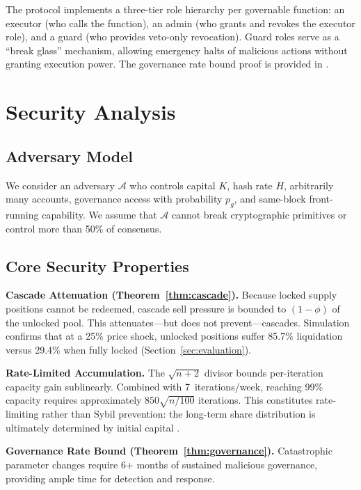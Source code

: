 \documentclass[10pt,a4paper,twocolumn]{article}
\theoremstyle{definition}
\theoremstyle{plain}
\theoremstyle{remark}
\begin{document}
The protocol implements a three-tier role hierarchy per governable function: an executor (who calls the function), an admin (who grants and revokes the executor role), and a guard (who provides veto-only revocation). Guard roles serve as a ``break glass'' mechanism, allowing emergency halts of malicious actions without granting execution power. The governance rate bound proof is provided in \cite[\S B]{apx}.

\section{Security Analysis}
\label{sec:security}

\subsection{Adversary Model}

We consider an adversary $\mathcal{A}$ who controls capital $K$, hash rate $H$, arbitrarily many accounts, governance access with probability $p_g$, and same-block front-running capability. We assume that $\mathcal{A}$ cannot break cryptographic primitives or control more than 50\% of consensus.

\subsection{Core Security Properties}

\textbf{Cascade Attenuation (Theorem~\ref{thm:cascade}).} Because locked supply positions cannot be redeemed, cascade sell pressure is bounded to $(1{-}\phi)$ of the unlocked pool. This attenuates---but does not prevent---cascades. Simulation confirms that at a 25\% price shock, unlocked positions suffer 85.7\% liquidation versus 29.4\% when fully locked (Section~\ref{sec:evaluation}).

\textbf{Rate-Limited Accumulation.} The $\sqrt{n{+}2}$ divisor bounds per-iteration capacity gain sublinearly. Combined with 7~iterations/week, reaching 99\% capacity requires approximately $850\sqrt{n/100}$ iterations. This constitutes rate-limiting rather than Sybil prevention: the long-term share distribution is ultimately determined by initial capital \cite[\S D]{apx}.

\textbf{Governance Rate Bound (Theorem~\ref{thm:governance}).} Catastrophic parameter changes require 6+ months of sustained malicious governance, providing ample time for detection and response.
\end{document}
